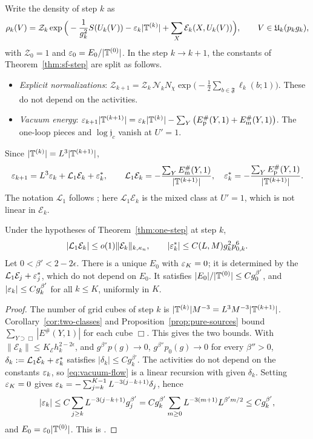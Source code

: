 Write the density of step $k$ as
\begin{equation}\label{eq:rho-k}
\rho_k(V)=\mathcal Z_k\exp\Big(-\frac1{g_k^2}S(U_k(V))-\varepsilon_k|\mathbb T^{(k)}|+\sum_X\mathcal E_k(X,U_k(V))\Big),\qquad V\in\mathfrak U_k(p_kg_k),
\end{equation}
with $\mathcal Z_0=1$ and $\varepsilon_0=E_0/|\mathbb T^{(0)}|$. In the step $k\to k+1$, the constants of Theorem~\ref{thm:sf-step} are split as follows.
\begin{itemize}
\item \emph{Explicit normalizations}: $\mathcal Z_{k+1}=\mathcal Z_k\,\mathcal N_kN_\chi\exp\big(-\frac12\sum_{b\in\mathfrak F}\ell_k(b;1)\big)$. These do not depend on the activities.
\item \emph{Vacuum energy}: $\varepsilon_{k+1}|\mathbb T^{(k+1)}|=\varepsilon_k|\mathbb T^{(k)}|-\sum_Y\big(E^\#_{\rm p}(Y,1)+E^\#_{\rm m}(Y,1)\big)$. The one-loop pieces and $\log\mathfrak j_c$ vanish at $U'=1$.
\end{itemize}
Since $|\mathbb T^{(k)}|=L^3|\mathbb T^{(k+1)}|$,
\begin{equation}\label{eq:vacuum-flow}
\varepsilon_{k+1}=L^3\varepsilon_k+\mathcal L_1\mathcal E_k+\varepsilon^*_k,\qquad\mathcal L_1\mathcal E_k=-\frac{\sum_YE^\#_{\rm m}(Y,1)}{|\mathbb T^{(k+1)}|},\quad\varepsilon^*_k=-\frac{\sum_YE^\#_{\rm p}(Y,1)}{|\mathbb T^{(k+1)}|}.
\end{equation}
The notation $\mathcal L_1$ follows \cite{DimockI}; here $\mathcal L_1\mathcal E_k$ is the mixed class at $U'=1$, which is not linear in $\mathcal E_k$.

\begin{proposition}\label{prop:vacuum}
Under the hypotheses of Theorem~\ref{thm:one-step} at step $k$,
\[
|\mathcal L_1\mathcal E_k|\le o(1)\|\mathcal E_k\|_{k,\kappa_n},\qquad|\varepsilon^*_k|\le C(L,M)g_k^2p_{0,k}^6 .
\]
Let $0<\beta'<2-2\epsilon$. There is a unique $E_0$ with $\varepsilon_K=0$; it is determined by the $\mathcal L_1\mathcal E_j+\varepsilon^*_j$, which do not depend on $E_0$. It satisfies $|E_0|/|\mathbb T^{(0)}|\le Cg_0^{\beta'}$, and $|\varepsilon_k|\le Cg_k^{\beta'}$ for all $k\le K$, uniformly in $K$.
\end{proposition}

\begin{proof}
The number of grid cubes of step $k$ is $|\mathbb T^{(k)}|M^{-3}=L^3M^{-3}|\mathbb T^{(k+1)}|$. Corollary~\ref{cor:two-classes} and Proposition~\ref{prop:pure-sources} bound $\sum_{Y\supset\Box}|E^\#(Y,1)|$ for each cube $\Box$. This gives the two bounds. With $\|\mathcal E_k\|\le K_{\mathcal E}h_k^{2-2\epsilon}$, and $g^{\beta''}p(g)\to0$, $g^{\beta''}p_0(g)\to0$ for every $\beta''>0$, $\delta_k:=\mathcal L_1\mathcal E_k+\varepsilon^*_k$ satisfies $|\delta_k|\le Cg_k^{\beta'}$. The activities do not depend on the constants $\varepsilon_k$, so \eqref{eq:vacuum-flow} is a linear recursion with given $\delta_k$. Setting $\varepsilon_K=0$ gives $\varepsilon_k=-\sum_{j=k}^{K-1}L^{-3(j-k+1)}\delta_j$, hence
\[
|\varepsilon_k|\le C\sum_{j\ge k}L^{-3(j-k+1)}g_j^{\beta'}=Cg_k^{\beta'}\sum_{m\ge0}L^{-3(m+1)}L^{\beta'm/2}\le Cg_k^{\beta'} ,
\]
and $E_0=\varepsilon_0|\mathbb T^{(0)}|$. This is \cite[Theorem~24, (284)--(288)]{DimockI}.
\end{proof}


